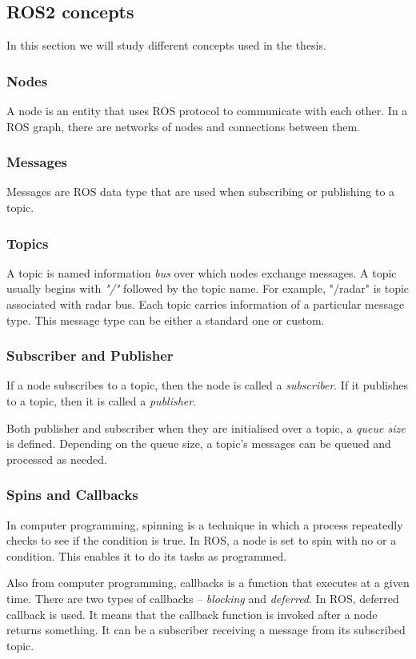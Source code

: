 \subsection{ROS2 concepts}
In this section we will study different concepts used in the thesis.
\subsubsection*{Nodes}
A node is an entity that uses ROS protocol to communicate with each other. In a ROS graph,
there are networks of nodes and connections between them.
\subsubsection*{Messages}
Messages are ROS data type that are used when subscribing or publishing to a topic.
\subsubsection*{Topics}
A topic is named information \textit{bus} over which nodes exchange messages.
A topic usually begins with \textit{"/"} followed by the topic name. For example, "/radar"
is topic associated with radar bus. Each topic carries information of a particular message
type. This message type can be either a standard one or custom.
\subsubsection*{Subscriber and Publisher}
If a node subscribes to a topic, then the node is called a \textit{subscriber}. If it
publishes to a topic, then it is called a \textit{publisher}.

Both publisher and subscriber when they are initialised over a topic, a \textit{queue
size} is defined. Depending on the queue size, a topic's messages can be queued and
processed as needed.
\subsubsection*{Spins and Callbacks}
In computer programming, spinning is a technique in which a process repeatedly checks to
see if the condition is true. In ROS, a node is set to spin with no or a condition. This
enables it to do its tasks as programmed.

Also from computer programming, callbacks is a function that executes at a given time.
There are two types of callbacks -- \textit{blocking} and \textit{deferred}. In ROS,
deferred callback is used. It means that the callback function is invoked after a node
returns something. It can be a subscriber receiving a message from its subscribed topic.

